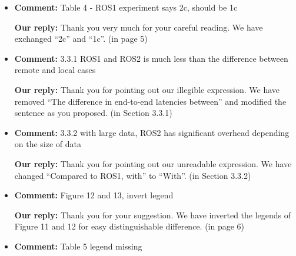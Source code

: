 \documentclass{article}
\begin{document}
\begin{itemize}

\item \begin{flushleft}
  \textbf{Comment:} Table 4 - ROS1 experiment says 2c, should be 1c
\end{flushleft}

  \begin{flushleft}
    \textbf{Our reply:} Thank you very much for your careful reading. We have exchanged ``2c'' and ``1c''. (in page 5)
  \end{flushleft}

\item \begin{flushleft}
  \textbf{Comment:} 3.3.1 ROS1 and ROS2 is much less than the difference between remote and local cases
\end{flushleft}

  \begin{flushleft}
    \textbf{Our reply:} Thank you for pointing out our illegible expression. We have removed ``The difference in end-to-end latencies between'' and modified the sentence as you proposed. (in Section 3.3.1)
  \end{flushleft}

\item \begin{flushleft}
  \textbf{Comment:} 3.3.2 with large data, ROS2 has significant overhead depending on the size of data
\end{flushleft}

  \begin{flushleft}
    \textbf{Our reply:} Thank you for pointing out our unreadable expression. We have changed ``Compared to ROS1, with'' to ``With''. (in Section 3.3.2)
  \end{flushleft}

\item \begin{flushleft}
  \textbf{Comment:} Figure 12 and 13, invert legend
\end{flushleft}

  \begin{flushleft}
    \textbf{Our reply:} Thank you for your suggestion. We have inverted the legends of Figure 11 and 12 for easy distinguishable difference. (in page 6)
  \end{flushleft}

\item \begin{flushleft}
  \textbf{Comment:} Table 5 legend missing
\end{flushleft}


\end{itemize}
\end{document}
